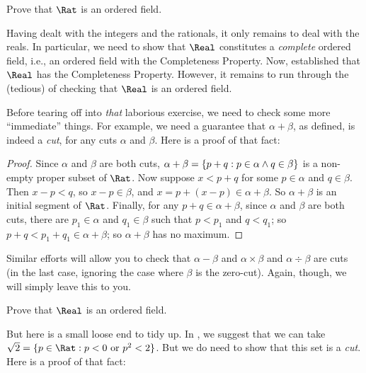 \documentclass[../../../include/open-logic-section]{subfiles}
\begin{document}
\begin{prob}
Prove that $\Rat$ is an ordered field.
\end{prob}

Having dealt with the integers and the rationals, it only remains to
deal with the reals. In particular, we need to show that $\Real$
constitutes a \emph{complete} ordered field, i.e., an ordered field
with the Completeness Property. Now, 
established that $\Real$ has the Completeness Property. However, it
remains to run through the (tedious) of checking that $\Real$ is an
ordered field. 

Before tearing off into \emph{that} laborious exercise, we need to
check some more ``immediate'' things. For example, we need a guarantee
that $\alpha + \beta$, as defined, is indeed a \emph{cut}, for any
cuts $\alpha$ and $\beta$. Here is a proof of that fact:

\begin{proof}	
Since $\alpha$ and $\beta$ are both cuts, $\alpha + \beta = \{ p
+ q : p \in \alpha \land q \in \beta \}$ is a non-empty proper subset of
$\Rat$. Now suppose $x < p + q$ for some $p \in \alpha$ and $q \in \beta$.
Then $x - p < q$, so $x - p \in \beta$, and $x = p + (x - p) \in
\alpha + \beta$. So $\alpha + \beta$ is an initial segment of $\Rat$.
Finally, for any $p + q \in \alpha + \beta$, since $\alpha$ and
$\beta$ are both cuts, there are $p_1 \in \alpha$ and $q_1 \in \beta$
such that $p < p_1$ and $q < q_1$; so $p + q < p_1 + q_1 \in \alpha +
\beta$; so $\alpha + \beta$ has no maximum. 
\end{proof}

Similar efforts will allow you to check that $\alpha - \beta$ and
$\alpha \times \beta$ and $\alpha \div \beta$ are cuts (in the last
case, ignoring the case where $\beta$ is the zero-cut). Again, though,
we will simply leave this to you. 

\begin{prob}
Prove that $\Real$ is an ordered field.
\end{prob}

But here is a small loose end to tidy up. In
, we suggest that we can take $\sqrt{2} =
\Setabs{p \in \Rat}{p < 0 \text{ or }p^2 < 2}$. But we do need to show
that this set is a \emph{cut}. Here is a proof of that fact:
\end{document}
